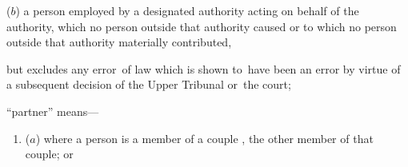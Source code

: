 \documentclass[12pt,a4paper]{article}
\begin{document}
\begin{enumerate}
\begin{enumerate}
   ($b$) 
    a person employed by a designated authority acting on behalf of the authority, which no person outside that authority caused or to which no person outside that authority materially contributed,
\end{enumerate}
    but excludes any error~of law which is shown to~have been an error by virtue of a subsequent decision of 
the Upper Tribunal  %
or~the court;


%




“partner” means—
\begin{enumerate}\item[]
    ($a$) 
    where a person is a member of 
a couple%
, the other member of that couple; or


\end{enumerate}
\end{enumerate}
\end{document}
